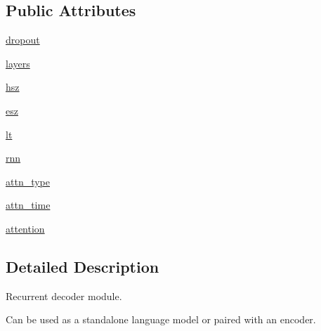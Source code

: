 \subsection*{Public Attributes}
\begin{DoxyCompactItemize}
\item 
\hyperlink{classparlai_1_1agents_1_1legacy__agents_1_1seq2seq_1_1modules__v1_1_1RNNDecoder_aafa9ff93604c33107620e2286d31bc81}{dropout}
\item 
\hyperlink{classparlai_1_1agents_1_1legacy__agents_1_1seq2seq_1_1modules__v1_1_1RNNDecoder_ae07b00d6b87da72582999538b279d57c}{layers}
\item 
\hyperlink{classparlai_1_1agents_1_1legacy__agents_1_1seq2seq_1_1modules__v1_1_1RNNDecoder_aab11ebf05dd6029a3db64b8170c552c7}{hsz}
\item 
\hyperlink{classparlai_1_1agents_1_1legacy__agents_1_1seq2seq_1_1modules__v1_1_1RNNDecoder_a6a0beb3ff226d0757b023acd8189366f}{esz}
\item 
\hyperlink{classparlai_1_1agents_1_1legacy__agents_1_1seq2seq_1_1modules__v1_1_1RNNDecoder_a6780484ed7624987b046a01952e48b4a}{lt}
\item 
\hyperlink{classparlai_1_1agents_1_1legacy__agents_1_1seq2seq_1_1modules__v1_1_1RNNDecoder_adc1ecb61f30e70d211f0d53adb399fd6}{rnn}
\item 
\hyperlink{classparlai_1_1agents_1_1legacy__agents_1_1seq2seq_1_1modules__v1_1_1RNNDecoder_acbbf1a67ceb9dc480faabf0db0fadb3d}{attn\+\_\+type}
\item 
\hyperlink{classparlai_1_1agents_1_1legacy__agents_1_1seq2seq_1_1modules__v1_1_1RNNDecoder_a596b3a31dc03cd19485d86ad7be90981}{attn\+\_\+time}
\item 
\hyperlink{classparlai_1_1agents_1_1legacy__agents_1_1seq2seq_1_1modules__v1_1_1RNNDecoder_a03c0b43494c2b18f4f6dcb04e14de8e1}{attention}
\end{DoxyCompactItemize}


\subsection{Detailed Description}
\begin{DoxyVerb}Recurrent decoder module.

Can be used as a standalone language model or paired with an encoder.
\end{DoxyVerb}
 

